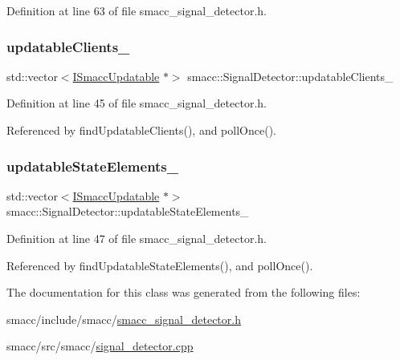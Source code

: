 Definition at line 63 of file smacc\+\_\+signal\+\_\+detector.\+h.

\mbox{\label{classsmacc_1_1SignalDetector_a01a457b4ec935473d6426efb7b87e683}} 
\subsubsection{\texorpdfstring{updatable\+Clients\+\_\+}{updatableClients\_}}
{\footnotesize\ttfamily std\+::vector$<$\hyperlink{classsmacc_1_1ISmaccUpdatable}{I\+Smacc\+Updatable} $\ast$$>$ smacc\+::\+Signal\+Detector\+::updatable\+Clients\+\_\+\hspace{0.3cm}{\ttfamily [private]}}



Definition at line 45 of file smacc\+\_\+signal\+\_\+detector.\+h.



Referenced by find\+Updatable\+Clients(), and poll\+Once().

\mbox{\label{classsmacc_1_1SignalDetector_a07a5e7bb00c348435d954e22682fa610}} 
\subsubsection{\texorpdfstring{updatable\+State\+Elements\+\_\+}{updatableStateElements\_}}
{\footnotesize\ttfamily std\+::vector$<$\hyperlink{classsmacc_1_1ISmaccUpdatable}{I\+Smacc\+Updatable} $\ast$$>$ smacc\+::\+Signal\+Detector\+::updatable\+State\+Elements\+\_\+\hspace{0.3cm}{\ttfamily [private]}}



Definition at line 47 of file smacc\+\_\+signal\+\_\+detector.\+h.



Referenced by find\+Updatable\+State\+Elements(), and poll\+Once().



The documentation for this class was generated from the following files\+:\begin{DoxyCompactItemize}
\item 
smacc/include/smacc/\hyperlink{smacc__signal__detector_8h}{smacc\+\_\+signal\+\_\+detector.\+h}\item 
smacc/src/smacc/\hyperlink{signal__detector_8cpp}{signal\+\_\+detector.\+cpp}\end{DoxyCompactItemize}
